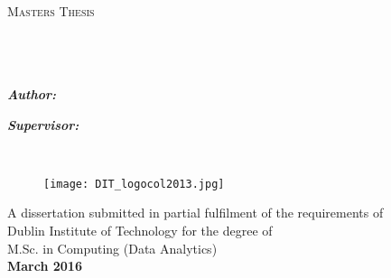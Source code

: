 \documentclass[11pt, oneside]{Thesis} %
\begin{document}
	\begin{titlepage}
		\begin{center}
			
			\textsc{\LARGE \univname}\\[1.5cm] %
			\textsc{\Large Masters Thesis}\\[0.5cm] %
			
			\HRule \\[0.4cm] %
			{\huge \bfseries \ttitle}\\[0.4cm] %
			\HRule \\[1.5cm] %
			
			\begin{minipage}{0.4\textwidth}
				\begin{flushleft} \large
					\textbf{\emph{Author:}}\\
					{\textbf{\authornames}} %
				\end{flushleft}
			\end{minipage}
			\begin{minipage}{0.5\textwidth}
				\begin{flushright} \large
					\textbf{\emph{Supervisor:}} \\
					\textbf{\supname} %
				\end{flushright}
			\end{minipage}\\[1.5cm]
			
			\begin{figure}[H]
				\texttt{[image: DIT\_logocol2013.jpg]}
				\label{fig:DIT_logocol2013}
			\end{figure}
			
			\large A dissertation submitted in partial fulfilment of the requirements of \\
				Dublin Institute of Technology for the degree of\\
				M.Sc. in Computing (Data Analytics)
			\\[1cm] %
			
			{\large \textbf{March 2016}}\\ %
			
			\vfill
		\end{center}
		
	\end{titlepage}
	
\end{document}
